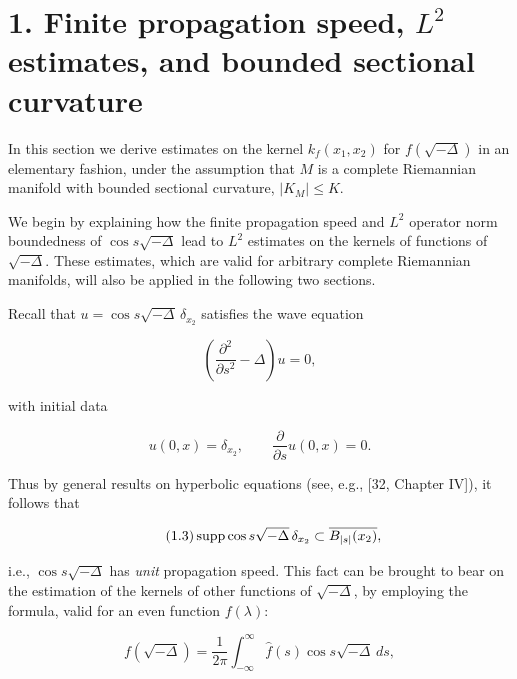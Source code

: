 \chapter{1. Finite propagation speed, \texorpdfstring{$L^2$}{L2} estimates, and bounded sectional curvature}

In this section we derive estimates on the kernel $k_f(x_1,x_2)$ for
$f(\sqrt{-\Delta})$ in an elementary fashion, under the assumption that $M$ is a
complete Riemannian manifold with bounded sectional curvature,
$\lvert K_M\rvert \leq K$.

We begin by explaining how the finite propagation speed and $L^2$ operator
norm boundedness of $\cos s\sqrt{-\Delta}$ lead to $L^2$ estimates on the
kernels of functions of $\sqrt{-\Delta}$. These estimates, which are valid for
arbitrary complete Riemannian manifolds, will also be applied in the following
two sections.

Recall that $u=\cos s\sqrt{-\Delta}\,\delta_{x_2}$ satisfies the wave equation

\begin{equation}\tag{1.1}
\left(\frac{\partial^2}{\partial s^2}-\Delta\right)u=0,
\end{equation}

with initial data

\begin{equation}\tag{1.2}
u(0,x)=\delta_{x_2}, \qquad \frac{\partial}{\partial s}u(0,x)=0.
\end{equation}

Thus by general results on hyperbolic equations (see, e.g., [32, Chapter IV]), it follows that

\begin{equation}\tag{1.3}
\operatorname{supp} \cos s\sqrt{-\Delta}\,\delta_{x_2}\subset \overline{B_{|s|}(x_2)},
\end{equation}

i.e., $\cos s\sqrt{-\Delta}$ has \emph{unit} propagation speed. This fact can be
brought to bear on the estimation of the kernels of other functions of
$\sqrt{-\Delta}$, by employing the formula, valid for an even function $f(\lambda)$:

\begin{equation}\tag{1.4}
f(\sqrt{-\Delta})=\frac{1}{2\pi}\int_{-\infty}^{\infty}\hat f(s)\cos s\sqrt{-\Delta}\,ds,
\end{equation}

